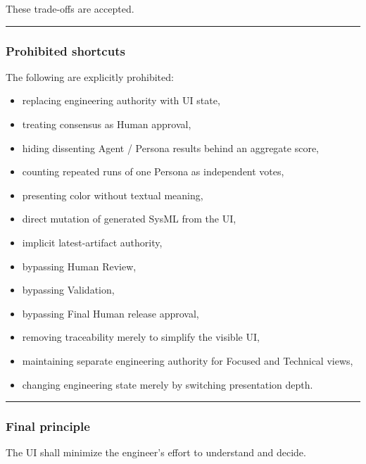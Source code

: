 These trade-offs are accepted.

\begin{center}\rule{0.5\linewidth}{0.5pt}\end{center}

\hypertarget{prohibited-shortcuts}{%
\subsubsection{Prohibited shortcuts}\label{prohibited-shortcuts}}

The following are explicitly prohibited:

\begin{itemize}
\tightlist
\item
  replacing engineering authority with UI state,
\item
  treating consensus as Human approval,
\item
  hiding dissenting Agent / Persona results behind an aggregate score,
\item
  counting repeated runs of one Persona as independent votes,
\item
  presenting color without textual meaning,
\item
  direct mutation of generated SysML from the UI,
\item
  implicit latest-artifact authority,
\item
  bypassing Human Review,
\item
  bypassing Validation,
\item
  bypassing Final Human release approval,
\item
  removing traceability merely to simplify the visible UI,
\item
  maintaining separate engineering authority for Focused and Technical views,
\item
  changing engineering state merely by switching presentation depth.
\end{itemize}

\begin{center}\rule{0.5\linewidth}{0.5pt}\end{center}

\hypertarget{final-principle}{%
\subsubsection{Final principle}\label{final-principle}}

The UI shall minimize the engineer's effort to understand and decide.


